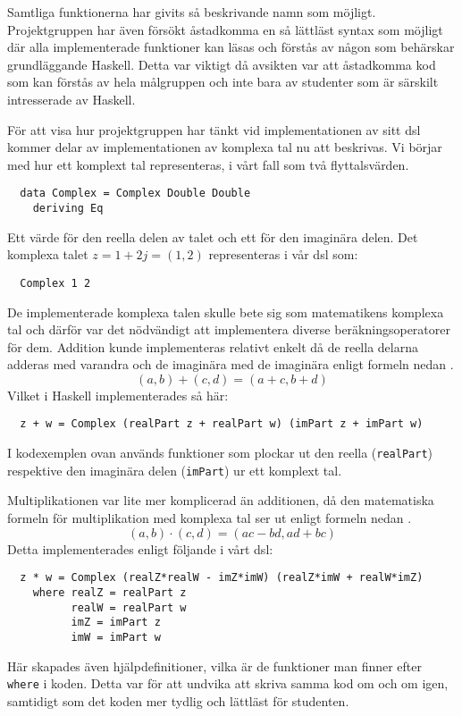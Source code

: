 \documentclass[12pt,a4paper,twoside,openright]{article}
\begin{document}
Samtliga funktionerna har givits så beskrivande namn som
möjligt. Projektgruppen har även försökt åstadkomma en så lättläst
syntax som möjligt där alla implementerade funktioner kan läsas och
förstås av någon som behärskar grundläggande Haskell. Detta var
viktigt då avsikten var att åstadkomma kod som kan förstås av hela
målgruppen och inte bara av studenter som är särskilt intresserade av
Haskell.

För att visa hur projektgruppen har tänkt vid implementationen av sitt
\gls{dsl} kommer delar av implementationen av komplexa tal nu att
beskrivas. Vi börjar med hur ett komplext tal representeras, i vårt
fall som två flyttalsvärden.
\begin{verbatim}
  data Complex = Complex Double Double
    deriving Eq
\end{verbatim}
Ett värde för den reella delen av talet och ett för den imaginära
delen. Det komplexa talet \(z = 1 + 2j = (1,2) \) representeras i vår
\gls{dsl} som:
\begin{verbatim}
  Complex 1 2
\end{verbatim}
De implementerade komplexa talen skulle bete sig som matematikens
komplexa tal och därför var det nödvändigt att implementera diverse
beräkningsoperatorer för dem. Addition kunde implementeras relativt
enkelt då de reella delarna adderas med varandra och de imaginära med
de imaginära enligt formeln nedan \cite{conway1978functions}.
\[(a, b) + (c, d) = (a + c, b + d)\]
Vilket i Haskell implementerades så här:
\begin{verbatim}
  z + w = Complex (realPart z + realPart w) (imPart z + imPart w)
\end{verbatim}

I kodexemplen ovan används funktioner som plockar ut den reella
(\texttt{realPart}) respektive den imaginära delen
(\texttt{imPart}) ur ett komplext tal.

Multiplikationen var lite mer komplicerad än additionen, då den
matematiska formeln för multiplikation med komplexa tal ser ut enligt
formeln nedan \cite{conway1978functions}.
\[(a, b) \cdot (c, d) = (ac - bd, ad + bc) \]
Detta implementerades enligt följande i vårt \gls{dsl}:
\begin{verbatim}
  z * w = Complex (realZ*realW - imZ*imW) (realZ*imW + realW*imZ)
    where realZ = realPart z
          realW = realPart w
          imZ = imPart z
          imW = imPart w
\end{verbatim}

Här skapades även hjälpdefinitioner, vilka är de funktioner man finner
efter \texttt{where} i koden. Detta var för att undvika
att skriva samma kod om och om igen, samtidigt som det koden mer
tydlig och lättläst för studenten.
\end{document}
